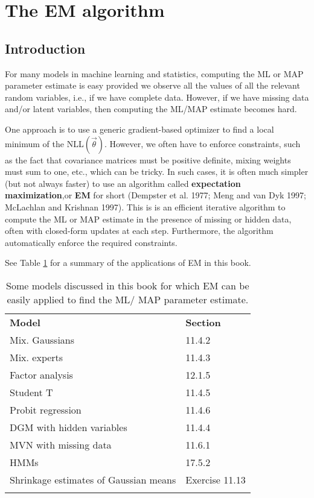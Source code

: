 \section{The EM algorithm}


\subsection{Introduction}
For many models in machine learning and statistics, computing the ML or MAP parameter estimate is easy provided we observe all the values of all the relevant random variables, i.e., if we have complete data. However, if we have missing data and/or latent variables, then computing the ML/MAP estimate becomes hard.

One approach is to use a generic gradient-based optimizer to find a local minimum of the NLL$(\vec{\theta})$. However, we often have to enforce constraints, such as the fact that covariance matrices must be positive definite, mixing weights must sum to one, etc., which can be tricky. In such cases, it is often much simpler (but not always faster) to use an algorithm called \textbf{expectation maximization},or \textbf{EM} for short (Dempster et al. 1977; Meng and van Dyk 1997; McLachlan and Krishnan 1997). This is is an efficient iterative algorithm to compute the ML or MAP estimate in the presence of missing or hidden data, often with closed-form updates at each step. Furthermore, the algorithm automatically enforce the required constraints.

See Table \ref{tab:summary-of-the-applications-of-EM} for a summary of the applications of EM in this book.

\begin{table}
\caption{Some models discussed in this book for which EM can be easily applied to find the ML/ MAP parameter estimate.}
\label{tab:summary-of-the-applications-of-EM}
\centering
\begin{tabular}{ll}
\hline\noalign{\smallskip}
\textbf{Model} & \textbf{Section} \\
\noalign{\smallskip}\svhline\noalign{\smallskip}
Mix. Gaussians & 11.4.2 \\
Mix. experts & 11.4.3 \\
Factor analysis & 12.1.5 \\
Student T & 11.4.5 \\
Probit regression & 11.4.6 \\
DGM with hidden variables & 11.4.4 \\
MVN with missing data & 11.6.1 \\
HMMs & 17.5.2 \\
Shrinkage estimates of Gaussian means & Exercise 11.13 \\
\noalign{\smallskip}\hline
\end{tabular}
\end{table}


